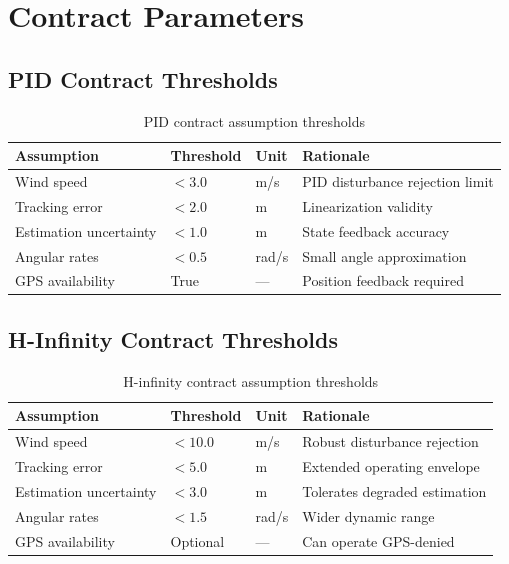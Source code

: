 \section{Contract Parameters}

\subsection{PID Contract Thresholds}

\begin{table}[htbp]
    \centering
    \caption{PID contract assumption thresholds}
    \label{tab:pid_contract}
    \begin{tabular}{@{}llll@{}}
        \toprule
        \textbf{Assumption} & \textbf{Threshold} & \textbf{Unit} & \textbf{Rationale} \\
        \midrule
        Wind speed & $< 3.0$ & m/s & PID disturbance rejection limit \\
        Tracking error & $< 2.0$ & m & Linearization validity \\
        Estimation uncertainty & $< 1.0$ & m & State feedback accuracy \\
        Angular rates & $< 0.5$ & rad/s & Small angle approximation \\
        GPS availability & True & --- & Position feedback required \\
        \bottomrule
    \end{tabular}
\end{table}

\subsection{H-Infinity Contract Thresholds}

\begin{table}[htbp]
    \centering
    \caption{H-infinity contract assumption thresholds}
    \label{tab:hinf_contract}
    \begin{tabular}{@{}llll@{}}
        \toprule
        \textbf{Assumption} & \textbf{Threshold} & \textbf{Unit} & \textbf{Rationale} \\
        \midrule
        Wind speed & $< 10.0$ & m/s & Robust disturbance rejection \\
        Tracking error & $< 5.0$ & m & Extended operating envelope \\
        Estimation uncertainty & $< 3.0$ & m & Tolerates degraded estimation \\
        Angular rates & $< 1.5$ & rad/s & Wider dynamic range \\
        GPS availability & Optional & --- & Can operate GPS-denied \\
        \bottomrule
    \end{tabular}
\end{table}


